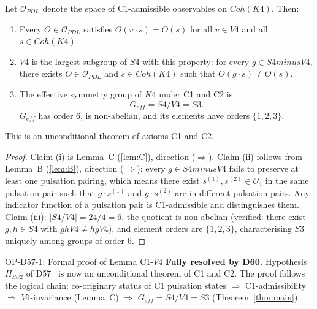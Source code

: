 \documentclass[11pt,a4paper]{article}
\def\Sfour{S4}%
\def\Vfour{V4}%
\def\Sthree{S3}%
\def\Kfour{K4}%
\def\cong{=}%
\def\setminus{ minus }%
\def\mathrm#1{#1}%
\newenvironment{theorembox}[1][]{%
  \begin{tcolorbox}[theoremstyle,title={Theorem\ifx\relax#1\relax\else: #1\fi}]}
  {\end{tcolorbox}}
\newenvironment{resolvedproblem}[1][]{%
  \begin{tcolorbox}[resolvedstyle,title={Resolved: #1}]}
  {\end{tcolorbox}}
\theoremstyle{plain}
\theoremstyle{definition}
\theoremstyle{remark}
\newcommand{\Kfour}{K_4}
\newcommand{\Sfour}{S_4}
\newcommand{\Vfour}{V_4}
\newcommand{\Sthree}{S_3}
\newcommand{\Coh}{\mathrm{Coh}}
\newcommand{\Orb}[1]{\mathcal{O}_{#1}}
\begin{document}
\begin{theorembox}[$G_{\mathrm{eff}} = \Sfour/\Vfour \cong \Sthree$ --- resolution of
$\mathrm{H_{SU2}}$]
\label{thm:main}
Let $\mathcal{O}_{\mathrm{PDL}}$ denote the space of C1-admissible observables on
$\Coh(\Kfour)$. Then:
\begin{enumerate}[label=(\roman*)]
\item Every $O \in \mathcal{O}_{\mathrm{PDL}}$ satisfies $O(v \cdot s) = O(s)$ for all
$v \in \Vfour$ and all $s \in \Coh(\Kfour)$.
\item $\Vfour$ is the largest subgroup of $\Sfour$ with this property: for every
$g \in \Sfour \setminus \Vfour$, there exists $O \in \mathcal{O}_{\mathrm{PDL}}$ and
$s \in \Coh(\Kfour)$ such that $O(g \cdot s) \neq O(s)$.
\item The effective symmetry group of $\Kfour$ under C1 and C2 is
\begin{equation}
G_{\mathrm{eff}} = \Sfour/\Vfour \cong \Sthree.
\label{eq:Geff}
\end{equation}
$G_{\mathrm{eff}}$ has order 6, is non-abelian, and its elements have orders $\{1, 2, 3\}$.
\end{enumerate}
This is an unconditional theorem of axioms C1 and C2.
\end{theorembox}

\begin{proof}
Claim (i) is Lemma~C (\ref{lem:C}), direction ($\Rightarrow$). Claim (ii) follows from
Lemma~B (\ref{lem:B}), direction ($\Rightarrow$): every $g \in \Sfour \setminus \Vfour$
fails to preserve at least one pulsation pairing, which means there exist $s^{(1)},
s^{(2)} \in \Orb{4}$ in the same pulsation pair such that $g \cdot s^{(1)}$ and
$g \cdot s^{(2)}$ are in different pulsation pairs. Any indicator function of a pulsation
pair is C1-admissible and distinguishes them. Claim (iii): $|\Sfour/\Vfour| = 24/4 = 6$,
the quotient is non-abelian (verified: there exist $g, h \in \Sfour$ with $gh\Vfour
\neq hg\Vfour$), and element orders are $\{1, 2, 3\}$, characterising $\Sthree$ uniquely
among groups of order 6.
\end{proof}

\begin{resolvedproblem}{OP-D57-1: Formal proof of Lemma C1-$\Vfour$}
\textcolor{resolvedgreen}{\textbf{Fully resolved by D60.}} Hypothesis~$\mathrm{H_{SU2}}$
of D57~\cite{PDL_D57} is now an unconditional theorem of C1 and C2. The proof follows
the logical chain: co-originary status of C1 pulsation states $\Rightarrow$ C1-admissibility
$\Rightarrow$ $\Vfour$-invariance (Lemma~C) $\Rightarrow$ $G_{\mathrm{eff}} = \Sfour/\Vfour
\cong \Sthree$ (Theorem~\ref{thm:main}).
\end{resolvedproblem}
\end{document}
